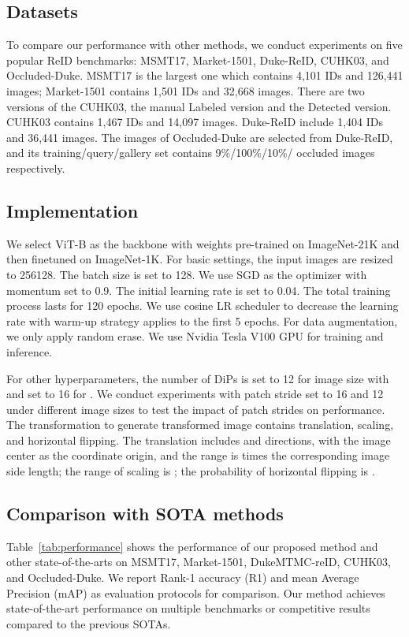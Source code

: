 \documentclass[10pt,twocolumn,letterpaper]{article}
\begin{document}
\subsection{Datasets}
\label{sec:datasets}
To compare our performance with other methods, we conduct experiments on five popular ReID benchmarks: MSMT17\cite{wei2018person}, Market-1501\cite{zheng2015scalable}, Duke-ReID\cite{ristani2016performance}, CUHK03\cite{li2014deepreid}, and Occluded-Duke\cite{miao2019pose}. MSMT17 is the largest one which contains 4,101 IDs and 126,441 images; Market-1501 contains 1,501 IDs and 32,668 images. There are two versions of the CUHK03, the manual Labeled version and the Detected version. CUHK03 contains 1,467 IDs and 14,097 images. Duke-ReID include 1,404 IDs and 36,441 images. The images of Occluded-Duke are selected from Duke-ReID, and its training/query/gallery set contains 9\%/100\%/10\%/ occluded images respectively.

\subsection{Implementation}
\label{sec:implementation}
We select ViT-B as the backbone with weights pre-trained on ImageNet-21K and then finetuned on ImageNet-1K. For basic settings, the input images are resized to 256128. The batch size is set to 128. We use SGD as the optimizer with momentum set to 0.9. The initial learning rate is set to 0.04. The total training process lasts for 120 epochs. We use cosine LR scheduler to decrease the learning rate with warm-up strategy\cite{he2016deep, fan2019spherereid} applies to the first 5 epochs. For data augmentation, we only apply random erase\cite{zhong2020random}. We use Nvidia Tesla V100 GPU for training and inference.

For other hyperparameters, the number of DiPs  is set to 12 for image size with  and set to 16 for . We conduct experiments with patch stride  set to 16 and 12 under different image sizes to test the impact of patch strides on performance. The transformation to generate transformed image  contains translation, scaling, and horizontal flipping. The translation includes  and  directions, with the image center as the coordinate origin, and the range is  times the corresponding image side length; the range of scaling is ; the probability of horizontal flipping is .


\subsection{Comparison with SOTA methods}
\label{sec:comparison}
Table~\ref{tab:performance} shows the performance of our proposed method and other state-of-the-arts on MSMT17, Market-1501, DukeMTMC-reID, CUHK03, and Occluded-Duke. We report Rank-1 accuracy (R1) and mean Average Precision (mAP)\cite{zheng2015scalable} as evaluation protocols for comparison. Our method achieves state-of-the-art performance on multiple benchmarks or competitive results compared to the previous SOTAs.
\end{document}
